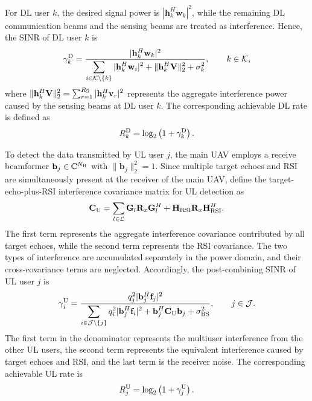 \documentclass[letterpaper,journal]{IEEEtran}
\begin{document}
For DL user $k$, the desired signal power is $|\mathbf h_k^H\mathbf w_k|^2$, while the remaining DL communication beams and the sensing beams are treated as interference. Hence, the SINR of DL user $k$ is
\begin{equation}
\gamma_k^{\rm D}
=
\frac{
|\mathbf h_k^H\mathbf w_k|^2
}{
\displaystyle
\sum_{i\in\mathcal K\setminus\{k\}}
|\mathbf h_k^H\mathbf w_i|^2
+
\|\mathbf h_k^H\mathbf V\|_2^2
+
\sigma_k^2
},
\qquad
k\in\mathcal K,
\label{eq:dl_sinr}
\end{equation}
where $\|\mathbf h_k^H\mathbf V\|_2^2=\sum_{r=1}^{R_{\rm S}}|\mathbf h_k^H\mathbf v_r|^2$ represents the aggregate interference power caused by the sensing beams at DL user $k$. The corresponding achievable DL rate is defined as
\begin{equation}
R_k^{\rm D}
=
\log_2
\left(
1+\gamma_k^{\rm D}
\right).
\label{eq:dl_rate}
\end{equation}

To detect the data transmitted by UL user $j$, the main UAV employs a receive beamformer $\mathbf b_j\in\mathbb C^{N_{\rm R}}$ with $\|\mathbf b_j\|_2^2=1$. Since multiple target echoes and RSI are simultaneously present at the receiver of the main UAV, define the target-echo-plus-RSI interference covariance matrix for UL detection as
\begin{equation}
\mathbf C_{\rm U}
=
\sum_{l\in\mathcal L}
\mathbf G_l
\mathbf R_x
\mathbf G_l^H
+
\mathbf H_{\rm RSI}
\mathbf R_x
\mathbf H_{\rm RSI}^H.
\label{eq:ul_interference_cov}
\end{equation}
The first term represents the aggregate interference covariance contributed by all target echoes, while the second term represents the RSI covariance. The two types of interference are accumulated separately in the power domain, and their cross-covariance terms are neglected. Accordingly, the post-combining SINR of UL user $j$ is
\begin{equation}
\gamma_j^{\rm U}
=
\frac{
q_j^2
|\mathbf b_j^H\mathbf f_j|^2
}{
\displaystyle
\sum_{i\in\mathcal J\setminus\{j\}}
q_i^2
|\mathbf b_j^H\mathbf f_i|^2
+
\mathbf b_j^H
\mathbf C_{\rm U}
\mathbf b_j
+
\sigma_{\rm BS}^2
},
\qquad
j\in\mathcal J.
\label{eq:ul_sinr}
\end{equation}
The first term in the denominator represents the multiuser interference from the other UL users, the second term represents the equivalent interference caused by target echoes and RSI, and the last term is the receiver noise. The corresponding achievable UL rate is
\begin{equation}
R_j^{\rm U}
=
\log_2
\left(
1+\gamma_j^{\rm U}
\right).
\label{eq:ul_rate}
\end{equation}
\end{document}
